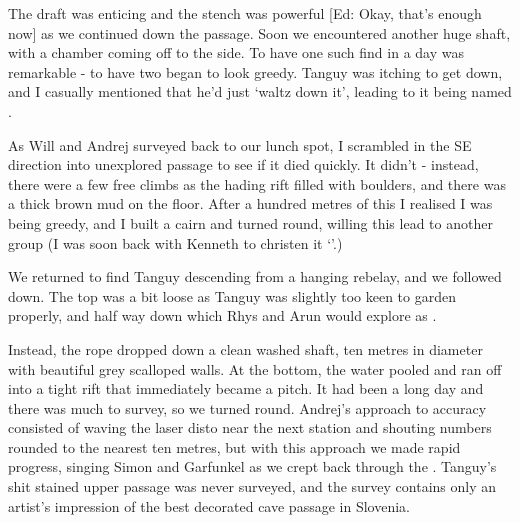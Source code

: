 The draft was enticing and the stench was powerful [Ed: Okay, that's enough now] as we continued down the passage. Soon we encountered another huge shaft, with a chamber coming off to the side. To have one such find in a day was remarkable - to have two began to look greedy. Tanguy was itching to get down, and I casually mentioned that he'd just `waltz down it', leading to it being named .

As Will and Andrej surveyed back to our lunch spot, I scrambled in the SE direction into unexplored passage to see if it died quickly. It didn't - instead, there were a few free climbs as the hading rift filled with boulders, and there was a thick brown mud on the floor. After a hundred metres of this I realised I was being greedy, and I built a cairn and turned round, willing this lead to another group (I was soon back with Kenneth to christen it `'.)
 
We returned to find Tanguy descending from a hanging rebelay, and we followed down. The top was a bit loose as Tanguy was slightly too keen to garden properly, and half way down  which Rhys and Arun would explore as .
 
Instead, the rope dropped down a clean washed shaft, ten metres in diameter with beautiful grey scalloped walls. At the bottom, the water pooled and ran off into a tight rift that immediately became a pitch. It had been a long day and there was much to survey, so we turned round. Andrej's approach to accuracy consisted of waving the laser disto near the next station and shouting numbers rounded to the nearest ten metres, but with this approach we made rapid progress, singing Simon and Garfunkel as we crept back through the . Tanguy's shit stained upper passage was never surveyed, and the survey contains only an artist's impression of the best decorated cave passage in Slovenia.



